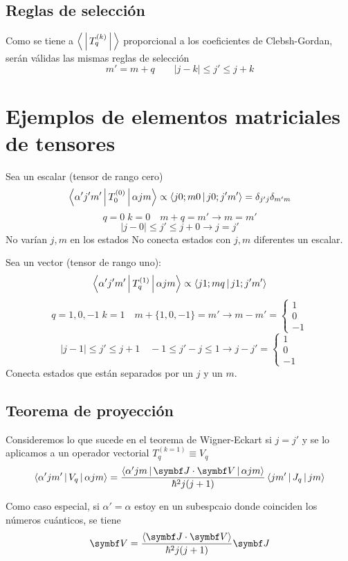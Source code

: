 \documentclass[10pt,oneside]{CBFT_book}
\begin{document}
\subsection{Reglas de selección}

Como se tiene a $\Braket{|T_q^{(k)}|}$ proporcional a los coeficientes de Clebsh-Gordan, serán válidas las 
mismas reglas de selección 
\[
	m' = m + q \qquad |j-k| \leq j' \leq j+k
\]

\section{Ejemplos de elementos matriciales de tensores}

Sea un escalar (tensor de rango cero)
\[
	\Braket{\alpha' j' m' |T_0^{(0)}| \alpha j m} \propto \Braket{j 0 ; m 0 |j 0 ; j' m'} =
	\delta_{j'j}\delta_{m'm} 
\]
\[
	q=0 \; k=0 \quad m+q=m' \rightarrow m=m'
\]
\[
	|j-0| \leq j' \leq j+0 \rightarrow j=j'
\]
No varían $j,m$ en los estados No conecta estados con $j,m$ diferentes un escalar.

Sea un vector (tensor de rango uno):
\[
	\Braket{\alpha' j' m'|T_q^{(1)}| \alpha j m} \propto \Braket{j 1;m q|j 1;j' m'}
\]
\[
	q=1,0,-1 \; k=1 \quad m+\{1,0,-1\}=m' \rightarrow m-m' =\begin{cases} 1 \\ 0 \\ -1 \end{cases}
\]
\[
	|j-1| \leq j' \leq j+1 \quad -1\leq j'-j \leq 1\rightarrow j-j'=\begin{cases} 1 \\ 0 \\ -1 \end{cases}
\]
Conecta estados que están separados por un $j$ y un $m$.

\subsection{Teorema de proyección}

Consideremos lo que sucede en el teorema de Wigner-Eckart si $j=j'$ y se lo aplicamos a un operador vectorial 
$T_q^{(k=1)} \equiv V_q$
\[
	\Braket{\alpha'j m'|V_q|\alpha j m} = 
	\frac{\Braket{\alpha' j m|\vb{J}\cdot\vb{V}|\alpha j m}}{\hbar^2j(j+1)}\Braket{j m'|J_q|j m}
\]

Como caso especial, si $\alpha' =\alpha$ estoy en un subespcaio donde coinciden los números cuánticos, se 
tiene
\[
	\vb{V} = \frac{\Braket{\vb{J}\cdot\vb{V}}}{\hbar^2j(j+1)} \vb{J}
\]
\end{document}
